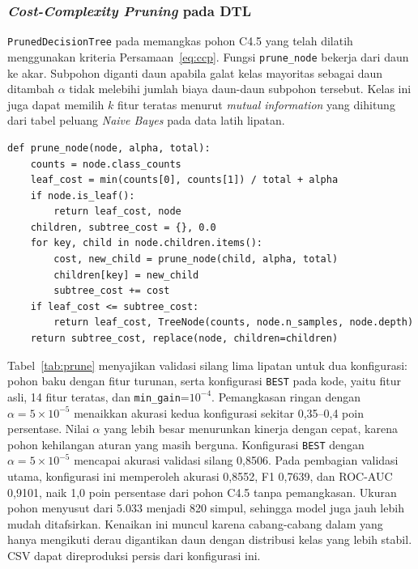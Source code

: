 \subsubsection{\textit{Cost-Complexity Pruning} pada DTL}
\texttt{PrunedDecisionTree} pada  memangkas pohon C4.5 yang telah dilatih menggunakan kriteria Persamaan~\ref{eq:ccp}. Fungsi \texttt{prune\_node} bekerja dari daun ke akar. Subpohon diganti daun apabila galat kelas mayoritas sebagai daun ditambah $\alpha$ tidak melebihi jumlah biaya daun-daun subpohon tersebut. Kelas ini juga dapat memilih $k$ fitur teratas menurut \textit{mutual information} yang dihitung dari tabel peluang \textit{Naive Bayes} pada data latih lipatan.

\begin{lstlisting}[emph={prune_node},caption={Pemangkasan \textit{cost-complexity} (\texttt{src/dtl\_tuning.py})},label={lst:prune}]
def prune_node(node, alpha, total):
    counts = node.class_counts
    leaf_cost = min(counts[0], counts[1]) / total + alpha
    if node.is_leaf():
        return leaf_cost, node
    children, subtree_cost = {}, 0.0
    for key, child in node.children.items():
        cost, new_child = prune_node(child, alpha, total)
        children[key] = new_child
        subtree_cost += cost
    if leaf_cost <= subtree_cost:
        return leaf_cost, TreeNode(counts, node.n_samples, node.depth)
    return subtree_cost, replace(node, children=children)
\end{lstlisting}

Tabel~\ref{tab:prune} menyajikan validasi silang lima lipatan untuk dua konfigurasi: pohon baku dengan fitur turunan, serta konfigurasi \texttt{BEST} pada kode, yaitu fitur asli, 14 fitur teratas, dan \texttt{min\_gain}=$10^{-4}$. Pemangkasan ringan dengan $\alpha=5\times10^{-5}$ menaikkan akurasi kedua konfigurasi sekitar 0,35--0,4 poin persentase. Nilai $\alpha$ yang lebih besar menurunkan kinerja dengan cepat, karena pohon kehilangan aturan yang masih berguna. Konfigurasi \texttt{BEST} dengan $\alpha=5\times10^{-5}$ mencapai akurasi validasi silang 0,8506. Pada pembagian validasi utama, konfigurasi ini memperoleh akurasi 0,8552, F1 0,7639, dan ROC-AUC 0,9101, naik 1,0 poin persentase dari pohon C4.5 tanpa pemangkasan. Ukuran pohon menyusut dari 5.033 menjadi 820 simpul, sehingga model juga jauh lebih mudah ditafsirkan. Kenaikan ini muncul karena cabang-cabang dalam yang hanya mengikuti derau digantikan daun dengan distribusi kelas yang lebih stabil. CSV  dapat direproduksi persis dari konfigurasi ini.

